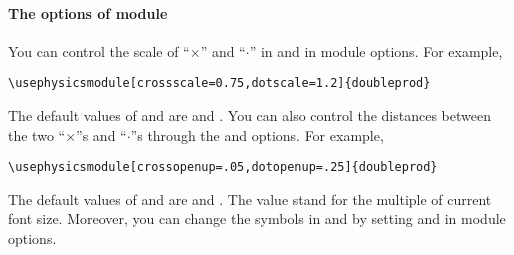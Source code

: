 \documentclass[11pt,letterpaper]{article}
\begin{document}
\paragraph{The options of  module}
You can control the scale of ``$\times$'' and ``$\cdot$'' in 
and  in module options. For example,
\begin{Verbatim}
\usephysicsmodule[crossscale=0.75,dotscale=1.2]{doubleprod}
\end{Verbatim}
The default values of  and  are  and
. You can also control the distances between the two ``$\times$''s and
``$\cdot$''s through the  and  options.
For example,
\begin{Verbatim}
\usephysicsmodule[crossopenup=.05,dotopenup=.25]{doubleprod}
\end{Verbatim}
The default values of  and  are 
and . The value stand for the multiple of current font size.
Moreover, you can change the symbols in  and 
by setting  and  in module options.
\end{document}

